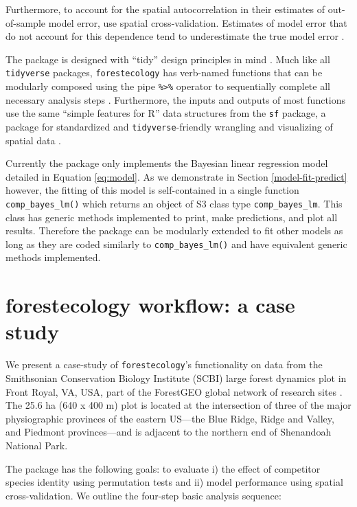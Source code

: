 \documentclass[12pt]{article}
\begin{document}
Furthermore, to account for the spatial autocorrelation in their
estimates of out-of-sample model error, \citet{allen_permutation_2020}
use spatial cross-validation. Estimates of model error that do not
account for this dependence tend to underestimate the true model error
\citep{roberts_cross-validation_2017}.

The package is designed with ``tidy'' design principles in mind
\citep{wickham_welcome_2019}. Much like all \texttt{tidyverse} packages,
\texttt{forestecology} has verb-named functions that can be modularly
composed using the pipe \texttt{\%\textgreater{}\%} operator to
sequentially complete all necessary analysis steps
\citep{bache_pipe_2020}. Furthermore, the inputs and outputs of most
functions use the same ``simple features for R'' data structures from
the \texttt{sf} package, a package for standardized and
\texttt{tidyverse}-friendly wrangling and visualizing of spatial data
\citep{pebesma_simple_2018}.

Currently the package only implements the Bayesian linear regression
model detailed in Equation \ref{eq:model}. As we demonstrate in Section
\ref{model-fit-predict} however, the fitting of this model is
self-contained in a single function \texttt{comp\_bayes\_lm()} which
returns an object of S3 class type \texttt{comp\_bayes\_lm}. This class
has generic methods implemented to print, make predictions, and plot all
results. Therefore the package can be modularly extended to fit other
models as long as they are coded similarly to \texttt{comp\_bayes\_lm()}
and have equivalent generic methods implemented.

\hypertarget{casestudy}{%
\section{forestecology workflow: a case study}\label{casestudy}}

We present a case-study of \texttt{forestecology}'s functionality on
data from the Smithsonian Conservation Biology Institute (SCBI) large
forest dynamics plot in Front Royal, VA, USA, part of the ForestGEO
global network of research sites
\citep[\citet{andersonteixeira_ctfs-forestgeo_2015}]{bourg_initial_2013}.
The 25.6 ha (640 x 400 m) plot is located at the intersection of three
of the major physiographic provinces of the eastern US---the Blue Ridge,
Ridge and Valley, and Piedmont provinces---and is adjacent to the
northern end of Shenandoah National Park.

The package has the following goals: to evaluate i) the effect of
competitor species identity using permutation tests and ii) model
performance using spatial cross-validation. We outline the four-step
basic analysis sequence:
\end{document}

